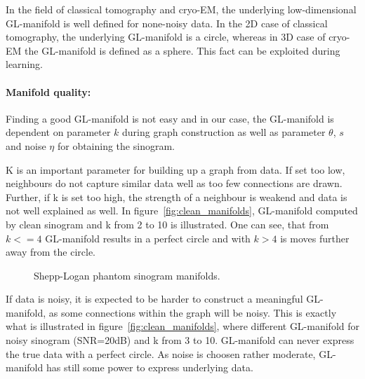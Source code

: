 \begin{tcolorbox}[colback=red!5!white,colframe=red!75!black]
    In the field of classical tomography and cryo-EM, the underlying low-dimensional GL-manifold is well defined for none-noisy data.
    In the 2D case of classical tomography, the underlying GL-manifold is a circle, whereas in 3D case of cryo-EM the GL-manifold
    is defined as a sphere.
    This fact can be exploited during learning.
\end{tcolorbox}

\paragraph{Manifold quality:}

Finding a good GL-manifold is not easy and in our case, the GL-manifold is dependent on parameter $k$ during graph construction
as well as parameter $\theta$, $s$ and noise $\eta$ for obtaining the sinogram.

K is an important parameter for building up a graph from data. If set too low, neighbours
do not capture similar data well as too few connections are drawn. 
Further, if k is set too high, the strength of a neighbour 
is weakend and data is not well explained as well.
In figure~\ref{fig:clean_manifolds}, GL-manifold computed by clean sinogram and k from 2 to 10 is illustrated.
One can see, that from $k <= 4$ GL-manifold results in a perfect circle and with $k >  4$ is moves 
further away from the circle. 


\begin{figure}[H]
    \centering
    \caption{Shepp-Logan phantom sinogram manifolds.}
\end{figure}

If data is noisy, it is expected to be harder to construct a meaningful GL-manifold, as some connections within
the graph will be noisy. This is exactly what is illustrated in figure~\ref{fig:clean_manifolds}, where 
different GL-manifold for noisy sinogram (SNR=20dB) and k from 3 to 10. GL-manifold can never express
the true data with a perfect circle. As noise is choosen rather moderate, GL-manifold has still some 
power to express underlying data.


